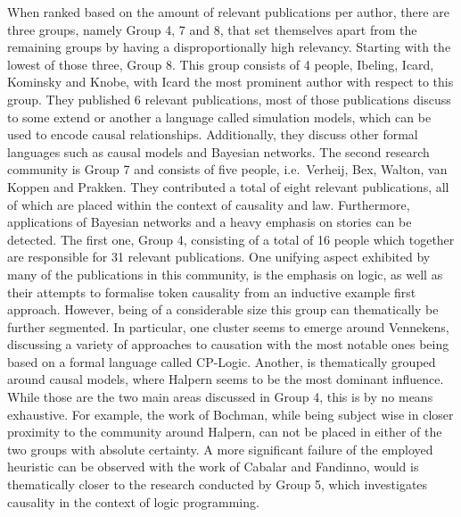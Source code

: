 \documentclass[11pt,a4paper]{book}
\theoremstyle{definition}
\theoremstyle{definition}
\theoremstyle{definition}
\theoremstyle{remark}
\begin{document}
When ranked based on the amount of relevant publications per author, there are three groups, namely Group 4, 7 and 8, that set themselves apart from the remaining groups by having a disproportionally high relevancy.
Starting with the lowest of those three, Group 8. This group consists of 4 people,  Ibeling, Icard, Kominsky and Knobe, with Icard the most prominent author with respect to this group.
They published 6 relevant publications, most of those publications discuss to some extend or another a language called simulation models, which can be used to encode causal relationships. 
Additionally, they discuss other formal languages such as causal models and Bayesian networks. 
The second research community is Group 7 and consists of five people, i.e.\ Verheij, Bex, Walton, van Koppen and Prakken. They contributed a total of eight relevant publications, all of which are placed within the context of causality and law. Furthermore, applications of Bayesian networks and a heavy emphasis on stories can be detected.
The first one, Group 4, consisting of  a total of 16 people which together are responsible for 31 relevant publications. One unifying aspect exhibited by many of the publications in this community, 
is the emphasis on logic, as well as their attempts to formalise token causality from an inductive example first approach.
However, being of a considerable size this group can thematically be further segmented.
In particular, one cluster seems to emerge around  Vennekens, discussing a variety of approaches to causation with the most notable ones being based on a formal language called CP-Logic.
Another, is thematically grouped around causal models, where Halpern seems to be the most dominant influence. While those are the two main areas discussed in Group 4, this is by no means exhaustive.
For example, the work of Bochman, while being subject wise in closer proximity to the community around Halpern, can not be placed in either of the two groups with absolute certainty.
A more significant failure of the employed heuristic can be observed with the work of Cabalar and Fandinno, would is thematically closer to the research conducted by Group 5, which investigates causality in the context of logic programming.
\end{document}
